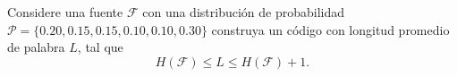 
Considere una fuente $\mathcal{F}$ con una distribución  de probabilidad $\mathcal{P}=\{0.20,0.15,0.15,0.10,0.10,0.30\}$ construya un código con longitud promedio de palabra $L$, tal que
$$H(\mathcal{F})\leq L \leq H(\mathcal{F})+1.$$
